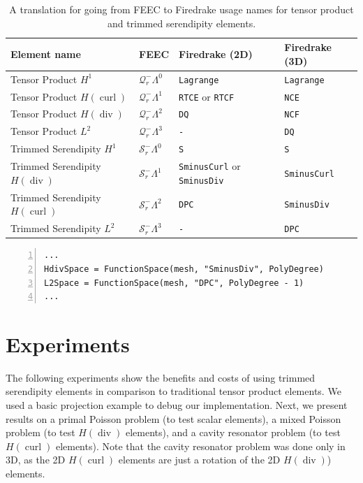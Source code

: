 \documentclass[format=acmsmall,screen,timestamp=false,a4paper]{acmart}
\DeclareMathOperator{\Div}{div}
\DeclareMathOperator{\curl}{curl}
\newcommand{\hcurl}{\ensuremath{{H}(\curl)}\xspace}
\newcommand{\hdiv}{\ensuremath{{H}(\Div)}\xspace}
\begin{document}
\begin{table}
\begin{tabular}{llll}
  \toprule
  Element name & FEEC & Firedrake (2D) & Firedrake (3D) \\
  \midrule
  Tensor Product $H^1$ & $\mathcal{Q}^-_r \Lambda^0$ & \texttt{Lagrange} & \texttt{Lagrange}  \\
  Tensor Product \hcurl& $\mathcal{Q}^-_r \Lambda^1$ & \texttt{RTCE} or \texttt{RTCF} & \texttt{NCE} \\
  Tensor Product \hdiv& $\mathcal{Q}^-_r \Lambda^2$ & \texttt{DQ} & \texttt{NCF}  \\
  Tensor Product $L^2$& $\mathcal{Q}^-_r \Lambda^3$ & \texttt{-} & \texttt{DQ}\\
  \midrule
  Trimmed Serendipity $H^1$ & $\mathcal{S}^-_r \Lambda^0 $ & \texttt{S} & \texttt{S}  \\
  Trimmed Serendipity \hdiv& $\mathcal{S}^-_r \Lambda^1$ & \texttt{SminusCurl} or \texttt{SminusDiv} & \texttt{SminusCurl}  \\
  Trimmed Serendipity \hcurl& $\mathcal{S}^-_r \Lambda^2$ & \texttt{DPC} & \texttt{SminusDiv}\\
  Trimmed Serendipity $L^2$& $\mathcal{S}^-_r \Lambda^3$ & \texttt{-} & \texttt{DPC}\\
  \bottomrule
\end{tabular}
\caption{A translation for going from FEEC to Firedrake usage names for tensor product and trimmed serendipity elements.}
\label{tab:FiredrakeNames}
\end{table}

\begin{lstlisting}[frame=single, caption={Setting up Firedrake to use the trimmed serendipity elements in a mixed Poisson problem in 3D.}, label={lst:pde_using_trimmed_serendipity}, numbers=left, firstnumber=1] 
...
HdivSpace = FunctionSpace(mesh, "SminusDiv", PolyDegree)
L2Space = FunctionSpace(mesh, "DPC", PolyDegree - 1)
...
\end{lstlisting}

  \section{Experiments}
    
The following experiments show the benefits and costs of using trimmed serendipity elements in comparison to traditional tensor product elements.  We used a basic projection example to debug our implementation.  Next, we present results on a primal Poisson problem (to test scalar elements), a mixed Poisson problem (to test \hdiv elements), and a cavity resonator problem (to test \hcurl elements).  Note that the cavity resonator problem was done only in 3D, as the 2D \hcurl elements are just a rotation of the 2D \hdiv) elements. 
   
\end{document}
